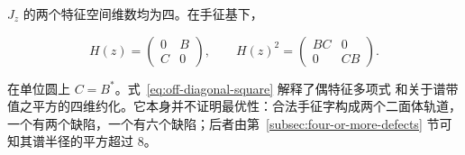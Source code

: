 \(J_z\) 的两个特征空间维数均为四。在手征基下，

\begin{equation}
\label{eq:off-diagonal-square}
H(z)=\begin{pmatrix}0&B\\C&0\end{pmatrix},\qquad H(z)^2=\begin{pmatrix}BC&0\\0&CB\end{pmatrix}.
\end{equation}

在单位圆上 \(C=B^{\ast}\)。式~\eqref{eq:off-diagonal-square} 解释了偶特征多项式
和关于谱带值之平方的四维约化。它本身并不证明最优性：合法手征字构成两个二面体轨道，
一个有两个缺陷，一个有六个缺陷；后者由第~\ref{subsec:four-or-more-defects}
节可知其谱半径的平方超过 8。
